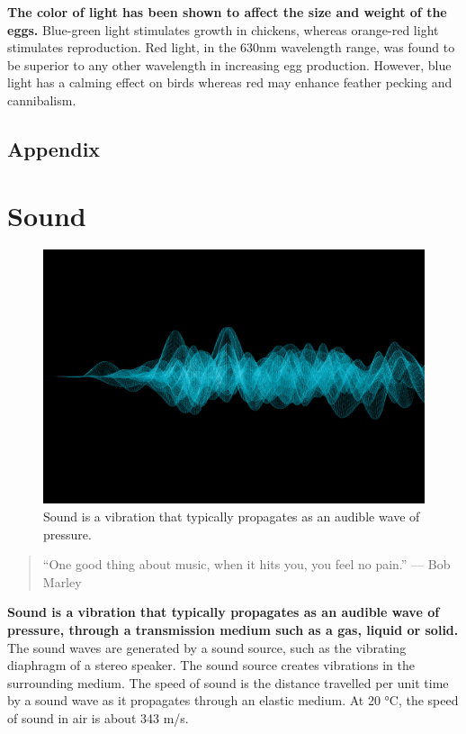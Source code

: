 \documentclass[]{book}
\begin{document}
\textbf{The color of light has been shown to affect the size and weight
of the eggs.} Blue-green light stimulates growth in chickens, whereas
orange-red light stimulates reproduction. Red light, in the 630nm
wavelength range, was found to be superior to any other wavelength in
increasing egg production. However, blue light has a calming effect on
birds whereas red may enhance feather pecking and cannibalism.

\section{Appendix}\label{appendix}

\chapter{Sound}\label{sound}

\begin{figure}

{\centering \includegraphics[width=1\linewidth,height=0.5\textheight]{figures/soundwave} 

}

\caption{Sound is a vibration that typically propagates as an audible wave of pressure.}\label{fig:soundwave}
\end{figure}

\begin{quote}
``One good thing about music, when it hits you, you feel no pain.'' ---
Bob Marley
\end{quote}

\textbf{Sound is a vibration that typically propagates as an audible
wave of pressure, through a transmission medium such as a gas, liquid or
solid.} The sound waves are generated by a sound source, such as the
vibrating diaphragm of a stereo speaker. The sound source creates
vibrations in the surrounding medium. The speed of sound is the distance
travelled per unit time by a sound wave as it propagates through an
elastic medium. At 20 °C, the speed of sound in air is about 343 m/s.
\end{document}

